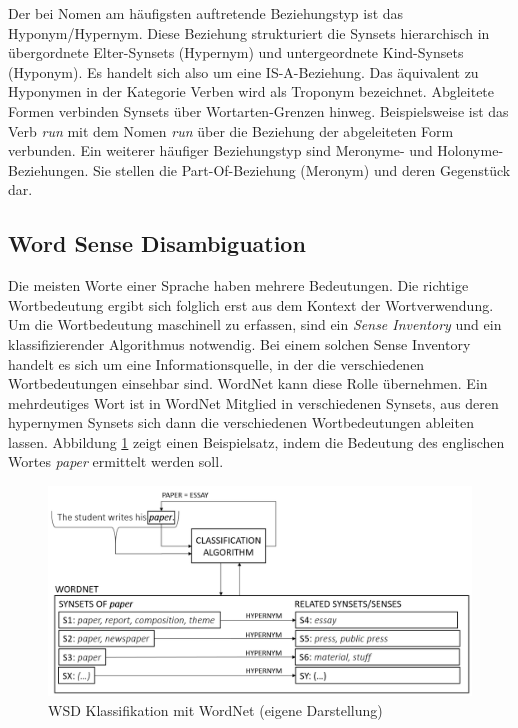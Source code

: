 Der bei Nomen am häufigsten auftretende Beziehungstyp ist das Hyponym/Hypernym. Diese Beziehung strukturiert die Synsets hierarchisch in übergordnete Elter-Synsets (Hypernym) und untergeordnete Kind-Synsets (Hyponym). Es handelt sich also um eine IS-A-Beziehung. Das äquivalent zu Hyponymen in der Kategorie Verben wird als Troponym bezeichnet. Abgleitete Formen verbinden Synsets über Wortarten-Grenzen hinweg. Beispielsweise ist das Verb \textit{run} mit dem Nomen \textit{run} über die Beziehung der abgeleiteten Form verbunden. Ein weiterer häufiger Beziehungstyp sind Meronyme- und Holonyme-Beziehungen. Sie stellen die Part-Of-Beziehung (Meronym) und deren Gegenstück dar.

\par
\subsection{Word Sense Disambiguation}

Die meisten Worte einer Sprache haben mehrere Bedeutungen. Die richtige Wortbedeutung ergibt sich folglich erst aus dem Kontext der Wortverwendung. Um die Wortbedeutung maschinell zu erfassen, sind ein \textit{Sense Inventory} und ein klassifizierender Algorithmus notwendig. Bei einem solchen Sense Inventory handelt es sich um eine Informationsquelle, in der die verschiedenen Wortbedeutungen einsehbar sind. WordNet kann diese Rolle übernehmen. Ein mehrdeutiges Wort ist in WordNet Mitglied in verschiedenen Synsets, aus deren hypernymen Synsets sich dann die verschiedenen Wortbedeutungen ableiten lassen. Abbildung \ref{fig:WSD} zeigt einen Beispielsatz, indem die Bedeutung des englischen Wortes \textit{paper} ermittelt werden soll.
\par 


\begin{figure}[H]
\begin{center}
\includegraphics[keepaspectratio=true, width=\textwidth]{pictures/WSD.png}
\caption{WSD Klassifikation mit WordNet (eigene Darstellung)}
\label{fig:WSD}
\end{center}
\end{figure}

